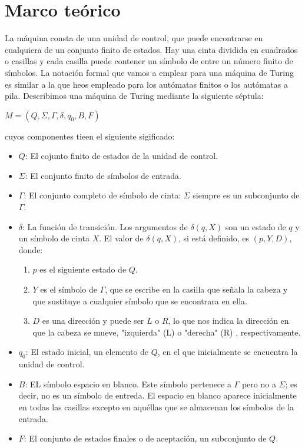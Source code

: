 \documentclass{article}
\begin{document}
\section{Marco teórico}
La máquina consta de una unidad de control, que puede encontrarse en cualquiera de un conjunto finito de estados. Hay una cinta dividida en cuadrados o casillas y cada casilla puede contener un símbolo de entre un número finito de símbolos.\newline
La notación formal que vamos a emplear para una máquina de Turing es similar a la que heos empleado para los autómatas finitos o los autómatas a pila. Describimos una máquina de Turing mediante la siguiente séptula:
\begin{center}
    $M=(Q,\Sigma,\Gamma,\delta,q_0,B,F)$
\end{center}
cuyos componentes tieen el siguiente sigificado:
\begin{itemize}
    \item $Q$: El cojunto finito de estados de la unidad de control.
    \item $\Sigma$: El conjunto finito de símbolos de entrada.
    \item $\Gamma$: El conjunto completo de símbolo de cinta: $\Sigma$ siempre es un subconjunto de $\Gamma$.
    \item $\delta$: La función de transición. Los argumentos de $\delta(q,X)$ son un estado de $q$ y un símbolo de cinta $X$. El valor de $\delta(q,X)$, si está definido, es $(p,Y,D)$, donde:
    \begin{enumerate}
        \item $p$ es el siguiente estado de $Q$.
        \item $Y$ es el símbolo de $\Gamma$, que se escribe en la casilla que señala la cabeza y que sustituye a cualquier símbolo que se encontrara en ella. 
        \item $D$ es una dirección y puede ser $L$ o $R$, lo que nos indica la dirección en que la cabeza se mueve, "izquierda" (L) o "derecha" (R) , respectivamente. 
    \end{enumerate}
    \item $q_0$: El estado inicial, un elemento de $Q$, en el que inicialmente se encuentra la unidad de control.
    \item $B$: EL símbolo espacio en blanco. Este símbolo pertenece a $\Gamma$ pero no a $\Sigma$; es decir, no es un símbolo de entreda. El espacio en blanco aparece inicialmente en todas las casillas excepto en aquéllas que se almacenan los símbolos de la entrada.
    \item $F$: El conjunto de estados finales o de aceptación, un subconjunto de $Q$.
\end{itemize}
\end{document}

